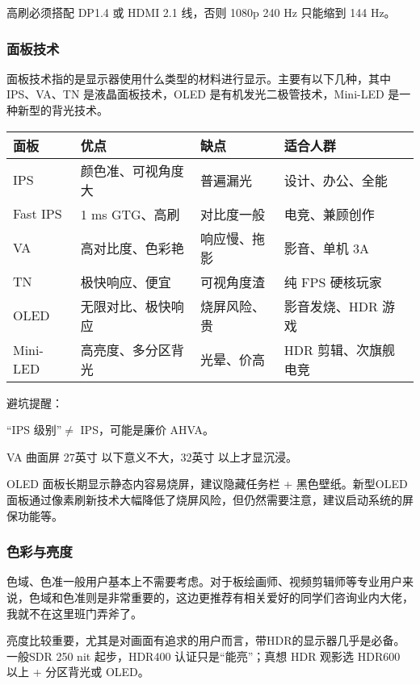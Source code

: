 \documentclass[../main.tex]{subfiles}
\begin{document}
\begin{caution}
  高刷必须搭配 DP1.4 或 HDMI 2.1 线，否则 1080p 240 Hz 只能缩到 144 Hz。
\end{caution}

\subsubsection{面板技术}

面板技术指的是显示器使用什么类型的材料进行显示。主要有以下几种，其中IPS、VA、TN 是液晶面板技术，OLED 是有机发光二极管技术，Mini-LED 是一种新型的背光技术。

\begin{table}[ht]
  \centering
  \begin{tabular}{l|l|l|l}
    \hline
    面板 & 优点 & 缺点 & 适合人群 \\
    \hline
    IPS & 颜色准、可视角度大 & 普遍漏光 & 设计、办公、全能 \\
    Fast IPS & 1 ms GTG、高刷 & 对比度一般 & 电竞、兼顾创作 \\
    VA & 高对比度、色彩艳 & 响应慢、拖影 & 影音、单机 3A \\
    TN & 极快响应、便宜 & 可视角度渣 & 纯 FPS 硬核玩家 \\
    OLED & 无限对比、极快响应 & 烧屏风险、贵 & 影音发烧、HDR 游戏 \\
    Mini-LED & 高亮度、多分区背光 & 光晕、价高 & HDR 剪辑、次旗舰电竞 \\
    \hline
  \end{tabular}
\end{table}

避坑提醒：

“IPS 级别”$\neq$ IPS，可能是廉价 AHVA。

VA 曲面屏 27英寸 以下意义不大，32英寸 以上才显沉浸。

OLED 面板长期显示静态内容易烧屏，建议隐藏任务栏 + 黑色壁纸。新型OLED面板通过像素刷新技术大幅降低了烧屏风险，但仍然需要注意，建议启动系统的屏保功能等。

\subsubsection{色彩与亮度}

色域、色准一般用户基本上不需要考虑。对于板绘画师、视频剪辑师等专业用户来说，色域和色准则是非常重要的，这边更推荐有相关爱好的同学们咨询业内大佬，我就不在这里班门弄斧了。

亮度比较重要，尤其是对画面有追求的用户而言，带HDR的显示器几乎是必备。一般SDR 250 nit 起步，HDR400 认证只是“能亮”；真想 HDR 观影选 HDR600 以上 + 分区背光或 OLED。
\end{document}
